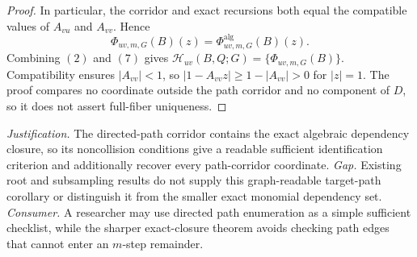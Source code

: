 \documentclass{article}
\begin{document}
\begin{proof}
In particular, the corridor and exact recursions both equal the compatible values of \(A_{vu}\) and \(A_{vv}\).  Hence
\[
 \Phi_{uv,m,G}(B)(z)
 =\Phi^{\mathrm{alg}}_{uv,m,G}(B)(z).
\tag{7}
\]
Combining \((2)\) and \((7)\) gives
\(\mathcal H_{uv}(B,Q;G)=\{\Phi_{uv,m,G}(B)\}\).  Compatibility ensures \(|A_{vv}|<1\), so \(|1-A_{vv}z|\ge1-|A_{vv}|>0\) for \(|z|=1\).  The proof compares no coordinate outside the path corridor and no component of \(D\), so it does not assert full-fiber uniqueness.
\end{proof}
\par\smallskip\noindent \textit{Justification.} The directed-path corridor contains the exact algebraic dependency closure, so its noncollision conditions give a readable sufficient identification criterion and additionally recover every path-corridor coordinate. \textit{Gap.} Existing root and subsampling results do not supply this graph-readable target-path corollary or distinguish it from the smaller exact monomial dependency set. \textit{Consumer.} A researcher may use directed path enumeration as a simple sufficient checklist, while the sharper exact-closure theorem avoids checking path edges that cannot enter an \(m\)-step remainder.
\end{document}
